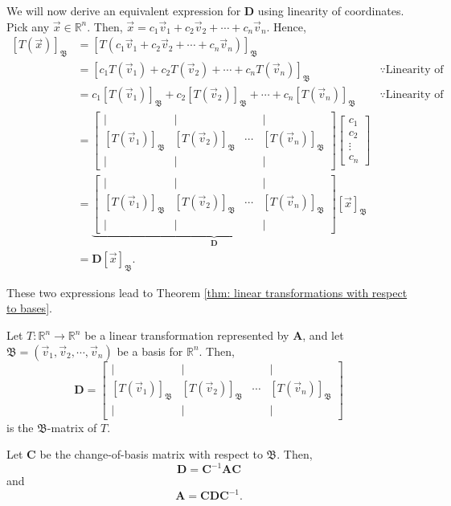 \documentclass[]{book}
\newcommand{\inv}[1]{\ensuremath{{#1}^{-1}}}
\newcommand{\invm}[1]{\ensuremath{\inv{\mat{#1}}}}
\newcommand{\bas}[1]{\ensuremath{\mathfrak{#1}}}
\newcommand{\coordb}[2]{\ensuremath{\left[#1\right]_{#2}}}
\newcommand{\vecxxdx}[1][x]{\ensuremath{\begin{bmatrix}
#1_1 \\
#1_2 \\
\vdots \\
#1_n
\end{bmatrix}}}
\newcommand{\mat}[1]{\ensuremath{\mathbf{#1}}}
\newcommand{\R}{\ensuremath{\mathbb{R}}}
\begin{document}
We will now derive an equivalent expression for $\mat{D}$ using linearity of coordinates. Pick any $\vec{x} \in \R^n$. Then, $\vec{x} = c_1\vec{v}_1 + c_2\vec{v}_2 + \cdots + c_n\vec{v}_n$. Hence,
\begin{align*}
    \coordb{T(\vec{x})}{\bas{B}} &= \coordb{T(c_1\vec{v}_1 + c_2\vec{v}_2 + \cdots + c_n\vec{v}_n)}{\bas{B}} \\
    &= \coordb{c_1T(\vec{v}_1) + c_2T(\vec{v}_2) + \cdots + c_nT(\vec{v}_n)}{\bas{B}} & \because \text{Linearity of L.T.} \\
    &= c_1\coordb{T(\vec{v}_1)}{\bas{B}} + c_2\coordb{T(\vec{v}_2)}{\bas{B}} + \cdots + c_n\coordb{T(\vec{v}_n)}{\bas{B}} & \because \text{Linearity of coordinates} \\
    &= \begin{bmatrix}\vert & \vert & & \vert \\ \coordb{T(\vec{v}_1)}{\bas{B}} & \coordb{T(\vec{v}_2)}{\bas{B}} & \cdots & \coordb{T(\vec{v}_n)}{\bas{B}} \\ \vert & \vert && \vert
    \end{bmatrix}\vecxxdx[c] \\
    &= \underbrace{\begin{bmatrix}\vert & \vert & & \vert \\ \coordb{T(\vec{v}_1)}{\bas{B}} & \coordb{T(\vec{v}_2)}{\bas{B}} & \cdots & \coordb{T(\vec{v}_n)}{\bas{B}} \\ \vert & \vert && \vert
    \end{bmatrix}}_{\mat{D}} \coordb{\vec{x}}{\bas{B}} \\
    &= \mat{D}\coordb{\vec{x}}{\bas{B}}.
\end{align*}

These two expressions lead to Theorem \ref{thm: linear transformations with respect to bases}.

\begin{theorem}
\label{thm: linear transformations with respect to bases}
    Let $T:\R^n \to \R^n$ be a linear transformation represented by $\mat{A}$, and let $\bas{B} = \left(\vec{v}_1, \vec{v}_2,\cdots,\vec{v}_n\right)$ be a basis for $\R^n$. Then, 
    \[\mat{D} = \begin{bmatrix}\vert & \vert & & \vert \\ \coordb{T(\vec{v}_1)}{\bas{B}} & \coordb{T(\vec{v}_2)}{\bas{B}} & \cdots & \coordb{T(\vec{v}_n)}{\bas{B}} \\ \vert & \vert && \vert
    \end{bmatrix}\]
    is the $\bas{B}$-matrix of $T$.
    
    Let $\mat{C}$ be the change-of-basis matrix with respect to $\bas{B}$. Then, 
    \[\mat{D} = \invm{C}\mat{A}\mat{C}\]
    and
    \[\mat{A} = \mat{C}\mat{D}\invm{C}.\]
\end{theorem}
\end{document}

